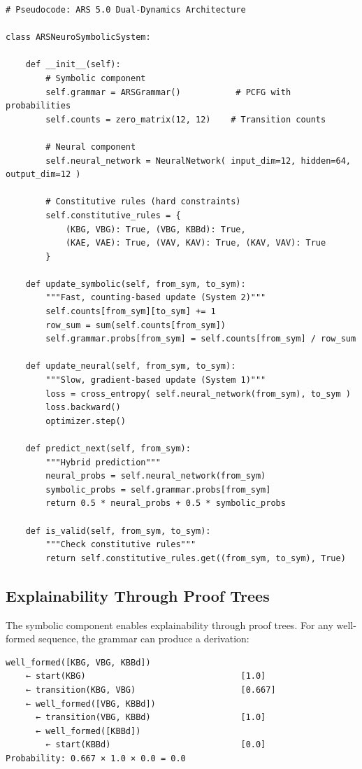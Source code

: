 \documentclass[12pt,a4paper]{article}
\begin{document}
\begin{lstlisting}[caption=Pseudocode for neuro-symbolic ARS]
# Pseudocode: ARS 5.0 Dual-Dynamics Architecture

class ARSNeuroSymbolicSystem:
    
    def __init__(self):
        # Symbolic component
        self.grammar = ARSGrammar()           # PCFG with probabilities
        self.counts = zero_matrix(12, 12)    # Transition counts
        
        # Neural component
        self.neural_network = NeuralNetwork( input_dim=12, hidden=64, output_dim=12 )
        
        # Constitutive rules (hard constraints)
        self.constitutive_rules = {
            (KBG, VBG): True, (VBG, KBBd): True,
            (KAE, VAE): True, (VAV, KAV): True, (KAV, VAV): True
        }
    
    def update_symbolic(self, from_sym, to_sym):
        """Fast, counting-based update (System 2)"""
        self.counts[from_sym][to_sym] += 1
        row_sum = sum(self.counts[from_sym])
        self.grammar.probs[from_sym] = self.counts[from_sym] / row_sum
    
    def update_neural(self, from_sym, to_sym):
        """Slow, gradient-based update (System 1)"""
        loss = cross_entropy( self.neural_network(from_sym), to_sym )
        loss.backward()
        optimizer.step()
    
    def predict_next(self, from_sym):
        """Hybrid prediction"""
        neural_probs = self.neural_network(from_sym)
        symbolic_probs = self.grammar.probs[from_sym]
        return 0.5 * neural_probs + 0.5 * symbolic_probs
    
    def is_valid(self, from_sym, to_sym):
        """Check constitutive rules"""
        return self.constitutive_rules.get((from_sym, to_sym), True)
\end{lstlisting}

\subsection{Explainability Through Proof Trees}

The symbolic component enables explainability through proof trees.
For any well-formed sequence, the grammar can produce a derivation:

\begin{lstlisting}[caption=Proof tree for a well-formed sequence]
well_formed([KBG, VBG, KBBd])
    ← start(KBG)                               [1.0]
    ← transition(KBG, VBG)                     [0.667]
    ← well_formed([VBG, KBBd])
      ← transition(VBG, KBBd)                  [1.0]
      ← well_formed([KBBd])
        ← start(KBBd)                          [0.0]
Probability: 0.667 × 1.0 × 0.0 = 0.0
\end{lstlisting}
\end{document}
